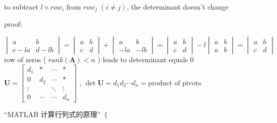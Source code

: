 \documentclass[12pt, a4paper]{article}
\begin{document}
{\newline
{} {\textcolor{anhao-purple}{to subtract $l \times row_i$ from $row_j$ $(i \neq j)$, the determinant doesn't change}}
\par proof:
\par\qquad 
\begin{math}
	\begin{vmatrix}
		a & b \\
		c-la & d-lb 
	\end{vmatrix}
	 = 
	\begin{vmatrix}
		a & b \\
		c & d 
	\end{vmatrix}
	 + 
	\begin{vmatrix}
		a & b \\
		-la & -lb 
	\end{vmatrix}
	 = 
	\begin{vmatrix}
		a & b \\
		c & d 
	\end{vmatrix}
	 -l
	\begin{vmatrix}
		a & b \\
		a & b 
	\end{vmatrix}
	 = 
	\begin{vmatrix}
		a & b \\
		c & d 
	\end{vmatrix}
\end{math}
\newline
{} {\textcolor{anhao-purple}{row of zeros ( $rank({\mathbf{A}}) < n$ ) leads to determinant equals 0}}
\newline
{}
{
	\textcolor{anhao-purple}
	{
		\begin{math}
			{\mathbf{U}} = 
			\begin{bmatrix}
				d_1 & * & \cdots & * \\
				0 & d_2 & \cdots & * \\
				\vdots & \ & \ddots & \vdots \\
				0 & \cdots & \cdots & d_n 
			\end{bmatrix}
		\end{math}
		, 
		\begin{math}
			\det{{\mathbf{U}}} = d_1 d_2 \cdots d_n = {\text{product of pivots}}
		\end{math}
	}
}
\par “MATLAB 计算行列式的原理”
\newline
{}
{
	\textcolor{anhao-purple}{
		\begin{math}
			\left\{

\end{math}}}}
\end{document}
